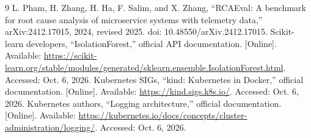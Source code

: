 \documentclass[conference]{IEEEtran}
\begin{document}
\begin{thebibliography}{9}
 L. Pham, H. Zhang, H. Ha, F. Salim, and X. Zhang, ``RCAEval: A benchmark for root cause analysis of microservice systems with telemetry data,'' arXiv:2412.17015, 2024, revised 2025. doi: 10.48550/arXiv.2412.17015.
 Scikit-learn developers, ``IsolationForest,'' official API documentation. [Online]. Available: \url{https://scikit-learn.org/stable/modules/generated/sklearn.ensemble.IsolationForest.html}. Accessed: Oct. 6, 2026.
 Kubernetes SIGs, ``kind: Kubernetes in Docker,'' official documentation. [Online]. Available: \url{https://kind.sigs.k8s.io/}. Accessed: Oct. 6, 2026.
 Kubernetes authors, ``Logging architecture,'' official documentation. [Online]. Available: \url{https://kubernetes.io/docs/concepts/cluster-administration/logging/}. Accessed: Oct. 6, 2026.
\end{thebibliography}
\end{document}
